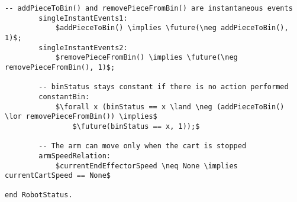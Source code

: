 \begin{lstlisting}[fontadjust, mathescape, frame=single]
        -- addPieceToBin() and removePieceFromBin() are instantaneous events
        singleInstantEvents1:
            $addPieceToBin() \implies \future(\neg addPieceToBin(), 1)$;
        singleInstantEvents2:
            $removePieceFromBin() \implies \future(\neg removePieceFromBin(), 1)$;

        -- binStatus stays constant if there is no action performed
        constantBin: 
            $\forall x (binStatus == x \land \neg (addPieceToBin() \lor removePieceFromBin()) \implies$
                $\future(binStatus == x, 1));$

        -- The arm can move only when the cart is stopped
        armSpeedRelation:
            $currentEndEffectorSpeed \neq None \implies currentCartSpeed == None$

end RobotStatus.
\end{lstlisting}